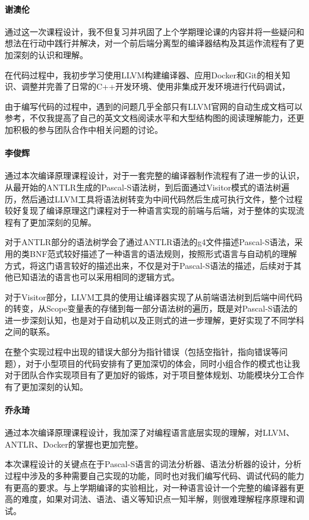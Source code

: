 \documentclass[lang=cn,11pt,a4paper,cite=authornum]{paper}
\begin{document}
\paragraph{谢澳伦} 通过这一次课程设计，我不但复习并巩固了上个学期理论课的内容并将一些疑问和想法在行动中践行并解决，对一个前后端分离型的编译器结构及其运作流程有了更加深刻的认识和理解。

在代码过程中，我初步学习使用LLVM构建编译器、应用Docker和Git的相关知识、调整并完善了日常的C++开发环境、使用非集成开发环境进行代码调试，

由于编写代码的过程中，遇到的问题几乎全部只有LLVM官网的自动生成文档可以参考，不仅我提高了自己的英文文档阅读水平和大型结构图的阅读理解能力，还更加积极的参与团队合作中相关问题的讨论。

\paragraph{李俊辉} 通过本次编译原理课程设计，对于一套完整的编译器制作流程有了进一步的认识，从最开始的ANTLR生成的Pascal-S语法树，到后面通过Visitor模式的语法树遍历，然后通过LLVM工具将语法树转变为中间代码然后生成可执行文件，整个过程较好复现了编译原理这门课程对于一种语言实现的前端与后端，对于整体的实现流程有了更加深刻的见解。

对于ANTLR部分的语法树学会了通过ANTLR语法的g4文件描述Pascal-S语法，采用的类BNF范式较好描述了一种语言的语法规则，按照形式语言与自动机的理解方式，将这门语言较好的描述出来，不仅是对于Pascal-S语法的描述，后续对于其他已知语法的语言也可以采用相同的逻辑方式。

对于Visitor部分，LLVM工具的使用让编译器实现了从前端语法树到后端中间代码的转变，从Scope变量表的存储到每一部分语法树的遍历，既是对Pascal-S语法的进一步深刻认知，也是对于自动机以及正则式的进一步理解，更好实现了不同学科之间的联系。

在整个实现过程中出现的错误大部分为指针错误（包括空指针，指向错误等问题），对于小型项目的代码安排有了更加深切的体会，同时小组合作的模式也让我对于团队合作实现项目有了更加好的锻炼，对于项目整体规划、功能模块分工合作有了更加深刻的认知。

\paragraph{乔永琦} 通过本次编译原理课程设计，我加深了对编程语言底层实现的理解，对LLVM、ANTLR、Docker的掌握也更加完整。

本次课程设计的关键点在于Pascal-S语言的词法分析器、语法分析器的设计，分析过程中涉及的多种需要自己实现的功能，同时也对我们编写代码、调试代码的能力有更高的要求。与上学期编译的实验相比，对一种语言设计一个完整的编译器有更高的难度，如果对词法、语法、语义等知识点一知半解，则很难理解程序原理和调试。
\end{document}
